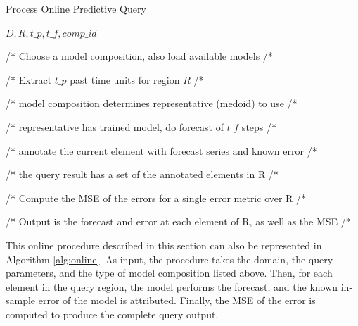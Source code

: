 \begin{algorithm}[h!]
\caption{Process Online Predictive Query}\label{alg:online}
\begin{algorithmic}[1] 
 {$D, R, t\_p, t\_f, comp\_id $}

/* Choose a model composition, also load available models /*

/* Extract $t\_p$ past time units for region $R$ /*



 /* model composition determines representative (medoid) to use /*
 
 /* representative has trained model, do forecast of $t\_f$ steps /*
 
 /* annotate the current element with forecast series and known error /*
 
 /* the query result has a set of the annotated elements in R /*
\EndFor

/* Compute the MSE of the errors for a single error metric over R /*

/* Output is the forecast and error at each element of R, as well as the MSE /* 
\EndFunction 
\end{algorithmic} 
\end{algorithm} 

This online procedure described in this section can also be represented in Algorithm \ref{alg:online}. As input, the procedure takes the domain, the query parameters, and the type of model composition listed above. Then, for each element in the query region, the model performs the forecast, and the known in-sample error of the model is attributed. Finally, the MSE of the error is computed to produce the complete query output.

